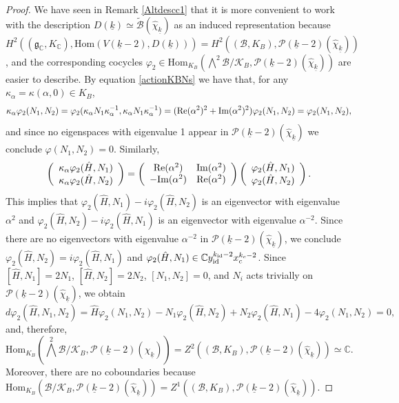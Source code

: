 \documentclass{amsart}
\theoremstyle{definition}
\theoremstyle{remark}
\numberwithin{equation}{section}
\newcommand{\C}{{\mathbb C}}
\newcommand{\cB}{{\mathcal B}}
\newcommand{\cK}{{\mathcal K}}
\newcommand{\cP}{{\mathcal P}}
\newcommand{\mfg}{{\mathfrak g}}
\newcommand{\Hom}{{\mathrm {Hom}}}
\begin{document}
\begin{proof}
    We have seen in Remark \ref{Altdescc1} that it is more convenient to work with the description $D(\underline k)\simeq \tilde \cB(\hat\chi_{\underline k})$ as an induced representation because $H^2((\mfg_\C,K_\C),\Hom(V(\underline k-2),D({\underline k})))=H^2((\cB,K_B),\cP(\underline k-2)(\hat\chi_{\underline k}))$, and the corresponding cocycles $\varphi_2\in \Hom_{K_B}\left(\bigwedge^2\cB/\cK_B,\cP(\underline k-2)(\hat\chi_{\underline k}) \right)$ are easier to describe.
    By equation \eqref{actionKBNs} we have that, for any $\kappa_\alpha=\kappa(\alpha,0)\in K_B$,
    \[
    \kappa_\alpha\varphi_2(N_1,N_2)=\varphi_2(\kappa_\alpha N_1\kappa_\alpha^{-1},\kappa_\alpha N_1\kappa_\alpha^{-1})=({\rm Re}(\alpha^2)^2+{\rm Im}(\alpha^2)^2)\varphi_2(N_1,N_2)=\varphi_2(N_1,N_2),
    \]
    and since no eigenspaces with eigenvalue 1 appear in $\cP(\underline k-2)(\hat\chi_{\underline k})$ we conclude $\varphi(N_1,N_2)=0$. Similarly,
    \[\left(\begin{array}{c}
    \kappa_\alpha\varphi_2(\hat H, N_1) \\
     \kappa_\alpha\varphi_2(\hat H,  N_2)
\end{array}\right)=\left(\begin{array}{cc}
    {\rm Re}(\alpha^2) & {\rm Im}(\alpha^2) \\
     -{\rm Im}(\alpha^2)&{\rm Re}(\alpha^2) 
\end{array}\right)\left(\begin{array}{c}
     \varphi_2(\hat H, N_1)  \\
     \varphi_2(\hat H, N_2) 
\end{array}\right).
\]
This implies that $\varphi_2(\hat H,N_1)-i\varphi_2(\hat H,N_2)$ is an eigenvector with eigenvalue $\alpha^2$ and  $\varphi_2(\hat H,N_2)-i\varphi_2(\hat H,N_1)$ is an eigenvector with eigenvalue $\alpha^{-2}$. Since there are no eigenvectors with eigenvalue $\alpha^{-2}$ in $\cP(\underline k-2)(\hat\chi_{\underline k})$, we conclude $\varphi_2(\hat H,N_2)=i\varphi_2(\hat H,N_1)$ and $\varphi_2(\hat H,N_1)\in \C y_{\rm id}^{k_{\rm id}-2}x_c^{k_c-2}$. Since $[\hat H,N_1]=2N_1$, $[\hat H,N_2]=2N_2$, $[N_1,N_2]=0$, and $N_i$ acts trivially on  $\cP(\underline k-2)(\hat\chi_{\underline k})$, we obtain
\[
d\varphi_2(\hat H,N_1,N_2)=\hat H\varphi_2(N_1,N_2)-N_1\varphi_2(\hat H,N_2)+N_2\varphi_2(\hat H,N_1)-4\varphi_2(N_1,N_2)=0,
\]
and, therefore,
\[
\Hom_{K_B}\left(\bigwedge^2\cB/\cK_B,\cP(\underline k-2)(\hat\chi_{\underline k}) \right)=Z^2((\cB,K_B),\cP(\underline k-2)(\hat\chi_{\underline k}) )\simeq\C.
\]
Moreover, there are no coboundaries because $\Hom_{K_B}(\cB/\cK_B,\cP(\underline k-2)(\hat\chi_{\underline k}))=Z^1((\cB,K_B),\cP(\underline k-2)(\hat\chi_{\underline k}) )$.


\end{proof}
\end{document}
